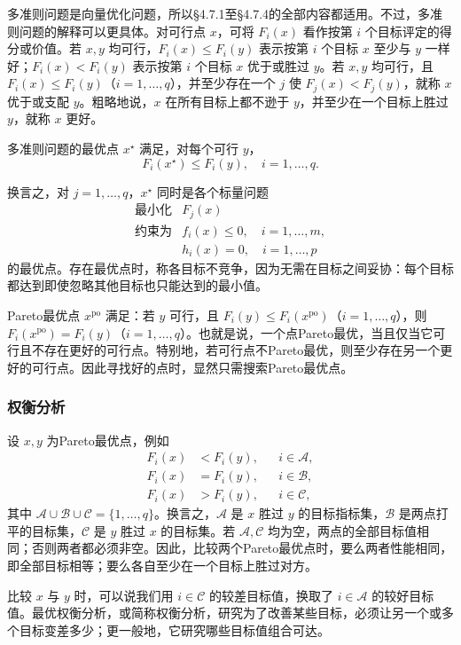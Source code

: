 多准则问题是向量优化问题，所以§4.7.1至§4.7.4的全部内容都适用。不过，多准则问题的解释可以更具体。对可行点 $x$，可将 $F_i(x)$ 看作按第 $i$ 个目标评定的得分或价值。若 $x,y$ 均可行，$F_i(x)\le F_i(y)$ 表示按第 $i$ 个目标 $x$ 至少与 $y$ 一样好；$F_i(x)<F_i(y)$ 表示按第 $i$ 个目标 $x$ 优于或胜过 $y$。若 $x,y$ 均可行，且 $F_i(x)\le F_i(y)$（$i=1,\ldots,q$），并至少存在一个 $j$ 使 $F_j(x)<F_j(y)$，就称 $x$ 优于或支配 $y$。粗略地说，$x$ 在所有目标上都不逊于 $y$，并至少在一个目标上胜过 $y$，就称 $x$ 更好。

多准则问题的最优点 $x^\star$ 满足，对每个可行 $y$，
\[
F_i(x^\star)\le F_i(y),\quad i=1,\ldots,q.
\]

换言之，对 $j=1,\ldots,q$，$x^\star$ 同时是各个标量问题
\[
\begin{array}{ll}\text{最小化}&F_j(x)\\\text{约束为}&f_i(x)\le0,\quad i=1,\ldots,m,\\&h_i(x)=0,\quad i=1,\ldots,p\end{array}
\]
的最优点。存在最优点时，称各目标不竞争，因为无需在目标之间妥协：每个目标都达到即使忽略其他目标也只能达到的最小值。

Pareto最优点 $x^{\mathrm{po}}$ 满足：若 $y$ 可行，且 $F_i(y)\le F_i(x^{\mathrm{po}})$（$i=1,\ldots,q$），则 $F_i(x^{\mathrm{po}})=F_i(y)$（$i=1,\ldots,q$）。也就是说，一个点Pareto最优，当且仅当它可行且不存在更好的可行点。特别地，若可行点不Pareto最优，则至少存在另一个更好的可行点。因此寻找好的点时，显然只需搜索Pareto最优点。

\subsubsection*{权衡分析}
设 $x,y$ 为Pareto最优点，例如
\[
\begin{aligned}
F_i(x)&<F_i(y),&&i\in\mathcal A,\\
F_i(x)&=F_i(y),&&i\in\mathcal B,\\
F_i(x)&>F_i(y),&&i\in\mathcal C,
\end{aligned}
\]
其中 $\mathcal A\cup\mathcal B\cup\mathcal C=\{1,\ldots,q\}$。换言之，$\mathcal A$ 是 $x$ 胜过 $y$ 的目标指标集，$\mathcal B$ 是两点打平的目标集，$\mathcal C$ 是 $y$ 胜过 $x$ 的目标集。若 $\mathcal A,\mathcal C$ 均为空，两点的全部目标值相同；否则两者都必须非空。因此，比较两个Pareto最优点时，要么两者性能相同，即全部目标相等；要么各自至少在一个目标上胜过对方。

比较 $x$ 与 $y$ 时，可以说我们用 $i\in\mathcal C$ 的较差目标值，换取了 $i\in\mathcal A$ 的较好目标值。最优权衡分析，或简称权衡分析，研究为了改善某些目标，必须让另一个或多个目标变差多少；更一般地，它研究哪些目标值组合可达。

